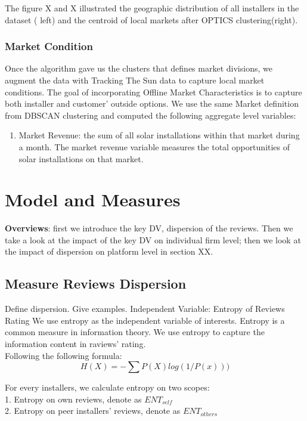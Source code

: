 \documentclass[mnsc,blindrev]{informs3} %
\begin{document}
The figure X and X illustrated the geographic distribution of all installers in the dataset ( left) and the centroid of local markets after OPTICS clustering(right). 

\subsubsection{Market Condition}
Once the algorithm gave us the clusters that defines market divisions, we augment the data with Tracking The Sun data to capture local market conditions. The goal of incorporating Offline Market Characteristics is to capture both installer and customer' outside options. We use the same Market definition from DBSCAN clustering and computed the following aggregate level variables: 
\begin{enumerate}
	\item Market Revenue: the sum of all solar installations within that market during a month. The market revenue variable measures the total opportunities of solar installations on that market. 
\end{enumerate} 
\section{Model and Measures}
\textbf{Overviews}: first we introduce the key DV, dispersion of the reviews. Then we take a look at the impact of the key DV on individual firm level; then we look at the impact of dispersion on platform level in section XX.  

\subsection{Measure Reviews Dispersion}
Define dispersion. Give examples. 
Independent Variable: Entropy of Reviews Rating
We use entropy as the independent variable of interests. Entropy is a common measure in information theory. We use entropy to capture the information content in raviews' rating. \\ 
Following the following formula:  \\ 
\begin{equation}
H(X)=-\sum P(X)log(1/P(x)))
\end{equation}

For every installers, we calculate entropy on two scopes: \\
1. Entropy on own reviews, denote as $ENT_{self}$ \\ 
2. Entropy on peer installers' reviews, denote as $ENT_{others}$ \\
\end{document}
